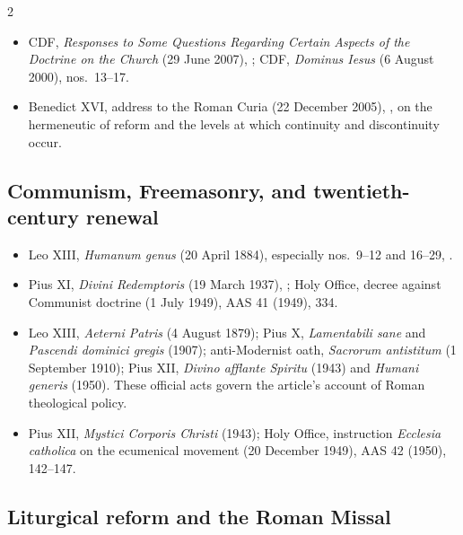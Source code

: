 \begin{multicols}{2}
{\begin{itemize}[itemsep=0.1em,topsep=0.15em]
\item CDF, \emph{Responses to Some Questions Regarding Certain Aspects of the Doctrine on the Church} (29 June 2007), ; CDF, \emph{Dominus Iesus} (6 August 2000), nos.~13--17.
\item Benedict XVI, address to the Roman Curia (22 December 2005), , on the hermeneutic of reform and the levels at which continuity and discontinuity occur.
\end{itemize}}

\subsection*{Communism, Freemasonry, and twentieth-century renewal}

{\footnotesize
\begin{itemize}[itemsep=0.1em,topsep=0.15em]
\item Leo XIII, \emph{Humanum genus} (20 April 1884), especially nos.~9--12 and 16--29, .
\item Pius XI, \emph{Divini Redemptoris} (19 March 1937), ; Holy Office, decree against Communist doctrine (1 July 1949), AAS 41 (1949), 334.
\item Leo XIII, \emph{Aeterni Patris} (4 August 1879); Pius X, \emph{Lamentabili sane} and \emph{Pascendi dominici gregis} (1907); anti-Modernist oath, \emph{Sacrorum antistitum} (1 September 1910); Pius XII, \emph{Divino afflante Spiritu} (1943) and \emph{Humani generis} (1950). These official acts govern the article's account of Roman theological policy.
\item Pius XII, \emph{Mystici Corporis Christi} (1943); Holy Office, instruction \emph{Ecclesia catholica} on the ecumenical movement (20 December 1949), AAS 42 (1950), 142--147.
\end{itemize}}

\subsection*{Liturgical reform and the Roman Missal}


\end{multicols}
